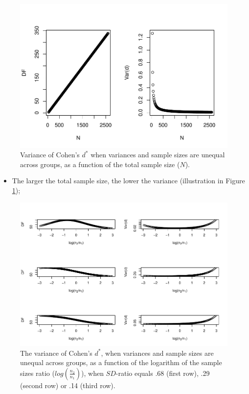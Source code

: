 \documentclass[
  english,
  man,mask]{apa6}
\providecommand{\tightlist}{%
  \setlength{\itemsep}{0pt}\setlength{\parskip}{0pt}}
\begin{document}
\begin{figure}
\centering
\includegraphics{SupMat1_files/figure-latex/varcohendprimehetunbalNsize2-1.pdf}
\caption{\label{fig:varcohendprimehetunbalNsize2}Variance of Cohen's \(d^*\) when variances and sample sizes are unequal across groups, as a function of the total sample size (\(N\)).}
\end{figure}

\begin{itemize}
\tightlist
\item
  The larger the total sample size, the lower the variance (illustration in Figure \ref{fig:varcohendprimehetunbalNsize2});
\end{itemize}

\begin{figure}
\centering
\includegraphics{SupMat1_files/figure-latex/varcohendprimehetunbalnratiosdratio2-1.pdf}
\caption{\label{fig:varcohendprimehetunbalnratiosdratio2}The variance of Cohen's \(d^*\), when variances and sample sizes are unequal across groups, as a function of the logarithm of the sample sizes ratio (\(log \left( \frac{n_2}{n_1} \right)\)), when \(SD\)-ratio equals .68 (first row), .29 (second row) or .14 (third row).}
\end{figure}
\end{document}
